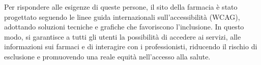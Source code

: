 Per rispondere alle esigenze di queste persone, il sito della farmacia è stato progettato seguendo le linee guida internazionali sull'accessibilità (WCAG), adottando soluzioni tecniche e grafiche che favoriscono l'inclusione. In questo modo, si garantisce a tutti gli utenti la possibilità di accedere ai servizi, alle informazioni sui farmaci e di interagire con i professionisti, riducendo il rischio di esclusione e promuovendo una reale equità nell'accesso alla salute.
